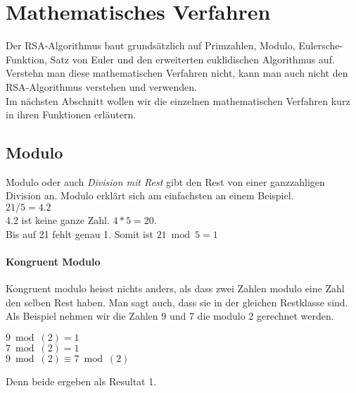 \section{Mathematisches Verfahren}
Der RSA-Algorithmus baut grundsätzlich auf Primzahlen, Modulo, Eulersche-Funktion, Satz von Euler und den erweiterten euklidischen Algorithmus auf. Verstehn man diese mathematischen Verfahren nicht, kann man auch nicht den RSA-Algorithmus verstehen und verwenden. \\
Im nächsten Abschnitt wollen wir die einzelnen mathematischen Verfahren kurz in ihren Funktionen erläutern.  
\subsection{Modulo}
Modulo oder auch \textit{Division mit Rest} gibt den Rest von einer ganzzahligen Division an. Modulo erklärt sich am einfachsten an einem Beispiel.\\
$ 21 / 5 = 4.2 $ \\
4.2 ist keine ganze Zahl. $ 4 * 5 = 20 $. \\
Bis auf 21 fehlt genau 1. Somit ist $ 21 \bmod 5 = 1 $
\paragraph{Kongruent Modulo}
Kongruent modulo heisst nichts anders, als dass zwei Zahlen modulo eine Zahl den selben Rest haben. Man sagt auch, dass sie in der gleichen Restklasse sind.\\
Als Beispiel nehmen wir die Zahlen 9 und 7 die modulo 2 gerechnet werden.\\
\begin{center}
$ 9 \bmod(2) = 1 $ \\
$ 7 \bmod(2) = 1 $ \\
$ 9 \bmod(2) \equiv 7 \bmod(2) $ \\
\end{center}
Denn beide ergeben als Resultat 1.
